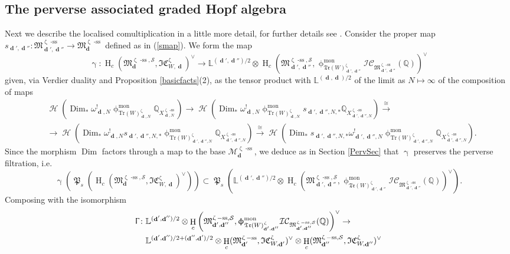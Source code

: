 \documentclass[a4paper,10pt]{amsart}
\renewcommand{\gamma}{\upgamma}
\renewcommand{\zeta}{\upzeta}
\renewcommand{\Gamma}{\Upgamma}
\renewcommand{\phi}{\upphi}
\DeclareMathOperator{\Pf}{\mathfrak{P}}
\newcommand{\LL}{\mathbb{L}}
\newcommand{\QQ}{\mathbb{Q}}
\newcommand{\SP}{\mathcal{S}}
\newcommand{\W}{\mathrm{Tr}(W)}
\newcommand{\WW}{\mathcal{T}r(W)}
\newcommand{\WWW}{\mathfrak{Tr}(W)}
\newcommand{\Mst}{\mathfrak{M}}
\newcommand{\Msp}{\mathcal{M}}
\newcommand{\ICS}{\mathcal{IC}}
\newcommand{\ICSt}{\mathfrak{IC}}
\newcommand{\phim}[1]{\phi^{\mon}_{#1}}
\DeclareMathOperator{\sst}{-ss}
\DeclareMathOperator{\mon}{mon}
\DeclareMathOperator{\Dim}{\mathrm{Dim}}
\DeclareMathOperator{\dd}{\mathbf{d}}
\DeclareMathOperator{\Ho}{\mathcal{H}}
\DeclareMathOperator{\HO}{H}
\begin{document}
\subsection{The perverse associated graded Hopf algebra}
Next we describe the localised comultiplication in a little more detail, for further details see \cite{Da13}.  Consider the proper map $s_{\dd',\dd''}\colon \Mst_{\dd',\dd''}^{\zeta\sst}\rightarrow\Mst_{\dd}^{\zeta\sst}$ defined as in (\ref{smap}).  We form the map 
\begin{equation}
\label{gammadef}
\gamma\colon \HO_c(\Mst^{\zeta\sst,\SP}_{\dd},\ICSt_{W,\dd}^{\zeta})^{\vee}\rightarrow \LL^{(\dd',\dd'')/2}\otimes\HO_c(\Mst^{\zeta\sst,\SP}_{\dd',\dd''},\phim{\WWW_{\dd',\dd''}^{\zeta}}\ICS_{\Mst_{\dd',\dd''}^{\zeta\sst}}(\mathbb{Q}))^{\vee}
\end{equation}
given, via Verdier duality and Proposition \ref{basicfacts}(2), as the tensor product with $\LL^{(\dd,\dd)/2}$ of the limit as $N\mapsto\infty$ of the composition of maps
\begin{align}
\label{sagain}
&\Ho\left(\Dim_*\omega^!_{\dd,N}\phim{\W_{\dd,N}^{\zeta}}\QQ_{X_{\dd,N}^{\zeta\sst}}\right)\rightarrow \Ho\left(\Dim_*\omega_{\dd,N}^!\phim{\W^{\zeta}_{\dd,N}}s_{\dd',\dd'',N,*}\QQ_{X^{\zeta\sst}_{\dd',\dd'',N}}\right)\xrightarrow{\cong}\\&\rightarrow \Ho\left(\Dim_*\omega_{\dd,N}^!s_{\dd',\dd'',N,*}\phim{\W^{\zeta}_{\dd',\dd'',N}}\QQ_{X^{\zeta\sst}_{\dd',\dd'',N}}\right)\xrightarrow{\cong}\Ho\left(\Dim_*s_{\dd',\dd'',N,*}\omega_{\dd',\dd'',N}^!\phim{\W^{\zeta}_{\dd',\dd'',N}}\QQ_{X^{\zeta\sst}_{\dd',\dd'',N}}\right).\nonumber
\end{align}
Since the morphism $\Dim$ factors through a map to the base $\Msp^{\zeta\sst}_{\dd}$, we deduce as in Section \ref{PervSec} that $\gamma$ preserves the perverse filtration, i.e.
\[
\gamma\left(\Pf_s\left(\HO_c(\Mst_{\dd}^{\zeta\sst,\SP},\ICSt_{W,\dd}^{\zeta})^{\vee}\right)\right)\subset \Pf_{s}\left(\LL^{(\dd',\dd'')/2}\otimes\HO_c\left(\Mst^{\zeta\sst,\SP}_{\dd',\dd''},\phim{\WWW^{\zeta}_{\dd',\dd''}}\ICS_{\Mst_{\dd',\dd''}^{\zeta\sst}}(\mathbb{Q})\right)^{\vee}\right).
\]
Composing with the isomorphism
\begin{align*}
\Gamma\colon &\LL^{(\dd',\dd'')/2}\otimes \HO_c\left(\Mst^{\zeta\sst,\SP}_{\dd',\dd''},\phim{\WWW^{\zeta}_{\dd',\dd''}}\ICS_{\Mst_{\dd',\dd''}^{\zeta\sst,\SP}}(\mathbb{Q})\right)^{\vee}\rightarrow \\&\LL^{(\dd',\dd'')/2+(\dd'',\dd')/2}\otimes \HO_c(\Mst^{\zeta\sst}_{\dd'},\ICSt_{W,\dd'}^{\zeta})^{\vee}\otimes\HO_c(\Mst^{\zeta\sst,\SP}_{\dd''},\ICSt_{W,\dd''}^{\zeta})^{\vee}
\end{align*}
\end{document}
